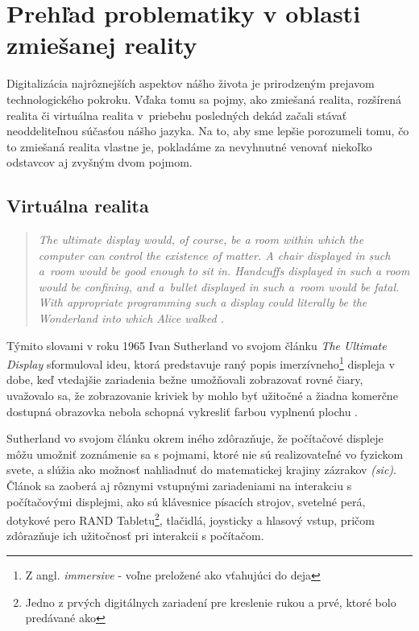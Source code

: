 \section{Prehľad problematiky v oblasti zmiešanej reality}
Digitalizácia najrôznejších aspektov nášho života je prirodzeným prejavom technologického pokroku. Vďaka tomu sa 
pojmy, ako zmiešaná realita, rozšírená realita či virtuálna realita v~priebehu posledných dekád začali stávať neoddeliteľnou súčasťou nášho jazyka. 
Na to, aby sme lepšie porozumeli tomu, čo to zmiešaná realita vlastne je, pokladáme za nevyhnutné venovať niekoľko odstavcov aj zvyšným dvom pojmom.

\subsection{Virtuálna realita}
\begin{quote}\itshape
  The ultimate display would, of course, be a room within which the computer can control the existence of matter. A chair displayed in such a~room 
  would be good enough to sit in. Handcuffs displayed in such a room would be confining, and a~bullet displayed in such a~room would be fatal. 
  With appropriate programming such a display could literally be the Wonderland into which Alice walked \cite{sutherlandUltimateDisplay1965b}.
\end{quote}
Týmito slovami v roku 1965 Ivan Sutherland vo svojom článku \emph{The Ultimate Display} sformuloval ideu, ktorá predstavuje raný popis 
imerzívneho\footnote{Z angl. \emph{immersive} - voľne preložené ako vťahujúci do deja} displeja v dobe, keď vtedajšie zariadenia bežne umožňovali 
zobrazovať rovné čiary, uvažovalo sa, že zobrazovanie kriviek by mohlo byť užitočné a žiadna komerčne dostupná obrazovka nebola schopná vykresliť farbou 
vyplnenú plochu \cite{sutherlandUltimateDisplay1965b}. 

Sutherland vo svojom článku okrem iného zdôrazňuje, že počítačové displeje môžu umožniť zoznámenie sa s pojmami, ktoré nie sú realizovateľné vo fyzickom svete, 
a slúžia ako možnosť nahliadnuť do matematickej krajiny zázrakov \emph{(sic)}. Článok sa zaoberá aj rôznymi vstupnými zariadeniami na interakciu s počítačovými 
displejmi, ako sú klávesnice písacích strojov, svetelné perá, dotykové pero RAND Tabletu\footnote{Jedno z prvých digitálnych zariadení pre kreslenie rukou a prvé, 
ktoré bolo predávané ako }, tlačidlá, joysticky a hlasový vstup, pričom zdôrazňuje ich užitočnosť pri interakcii s počítačom. 

